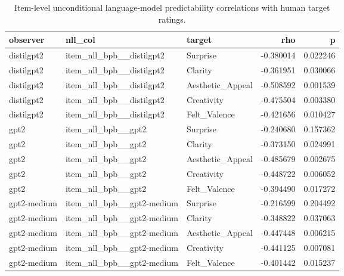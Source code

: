 \begin{table}
\caption{Item-level unconditional language-model predictability correlations with human target ratings.}
\label{tab:table_4_item_nll_correlations}
\begin{tabular}{lllrr}
\toprule
observer & nll\_col & target & rho & p \\
\midrule
distilgpt2 & item\_nll\_bpb\_\_distilgpt2 & Surprise & -0.380014 & 0.022246 \\
distilgpt2 & item\_nll\_bpb\_\_distilgpt2 & Clarity & -0.361951 & 0.030066 \\
distilgpt2 & item\_nll\_bpb\_\_distilgpt2 & Aesthetic\_Appeal & -0.508592 & 0.001539 \\
distilgpt2 & item\_nll\_bpb\_\_distilgpt2 & Creativity & -0.475504 & 0.003380 \\
distilgpt2 & item\_nll\_bpb\_\_distilgpt2 & Felt\_Valence & -0.421656 & 0.010427 \\
gpt2 & item\_nll\_bpb\_\_gpt2 & Surprise & -0.240680 & 0.157362 \\
gpt2 & item\_nll\_bpb\_\_gpt2 & Clarity & -0.373150 & 0.024991 \\
gpt2 & item\_nll\_bpb\_\_gpt2 & Aesthetic\_Appeal & -0.485679 & 0.002675 \\
gpt2 & item\_nll\_bpb\_\_gpt2 & Creativity & -0.448722 & 0.006052 \\
gpt2 & item\_nll\_bpb\_\_gpt2 & Felt\_Valence & -0.394490 & 0.017272 \\
gpt2-medium & item\_nll\_bpb\_\_gpt2-medium & Surprise & -0.216599 & 0.204492 \\
gpt2-medium & item\_nll\_bpb\_\_gpt2-medium & Clarity & -0.348822 & 0.037063 \\
gpt2-medium & item\_nll\_bpb\_\_gpt2-medium & Aesthetic\_Appeal & -0.447448 & 0.006215 \\
gpt2-medium & item\_nll\_bpb\_\_gpt2-medium & Creativity & -0.441125 & 0.007081 \\
gpt2-medium & item\_nll\_bpb\_\_gpt2-medium & Felt\_Valence & -0.401442 & 0.015237 \\
\bottomrule
\end{tabular}
\end{table}
